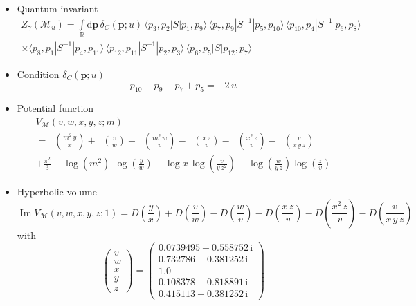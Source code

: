 \documentclass[12pt,reqno]{amsart}
\numberwithin{equation}{section}
\renewcommand{\Im}{\operatorname{Im}}
\DeclareMathOperator{\Li}{Li_2}
\newcommand{\I}{\mathrm{i}}
\begin{document}
\begin{itemize}
\item Quantum invariant
  \begin{multline}
    Z_\gamma \left( \mathcal{M}_u \right)
    =    \int\limits_\mathbb{R} 
    \mathrm{d} \boldsymbol{p} \,
    \delta_C(\boldsymbol{p}; u) \,
    \langle p_3 , p_2 | S | p_1 , p_9 \rangle \,
    \langle p_7 , p_9 | S^{-1} | p_5 , p_{10} \rangle \,
    \langle p_{10} , p_4 | S^{-1} | p_6 , p_8 \rangle 
    \\
    \times
    \langle p_8 , p_1 | S^{-1} | p_4 , p_{11} \rangle \,
    \langle p_{12} , p_{11} | S^{-1} | p_2 , p_3 \rangle \,
    \langle p_6 , p_5 | S | p_{12} , p_7 \rangle 
  \end{multline}

\item
Condition $\delta_C(\boldsymbol{p};u)$
  \begin{equation*}
    p_{10} - p_9 - p_7 + p_5
    = -  2 \, u
  \end{equation*}

\item Potential function
  \begin{multline*}
    V_{\mathcal{M}}(v, w, x,y,z; m)
    \\
    =
    \Li\left(\frac{m^2 \, y}{x}\right)
    + \Li\left(\frac{v}{w}\right)
    - \Li\left(\frac{m^2 \, w}{v}\right)
    -\Li\left(\frac{x \, z}{v}\right)
    - \Li\left(\frac{x^2 \, z}{v}\right)
    -\Li\left(\frac{v}{x \, y\, z}\right)
    \\
    +\frac{\pi^2}{3}
    + \log \left( m^2 \right) \, \log\left(\frac{y}{w}\right)
    + \log x \, \log\left(\frac{v}{y \, z^2}\right)
    + \log \left(\frac{w}{y \, z} \right)
    \log \left(\frac{z}{v}\right)
  \end{multline*}

\item Hyperbolic volume
  \begin{equation*}
    \Im V_{\mathcal{M}}(v, w, x,y,z; 1)
    =
    D\left(\frac{ y}{x}\right)
    + D\left(\frac{v}{w}\right)
    - D\left(\frac{ w}{v}\right)
    -D\left(\frac{x \, z}{v}\right)
    - D\left(\frac{x^2 \, z}{v}\right)
    -D\left(\frac{v}{x \, y\, z}\right)
  \end{equation*}
  with
  \begin{equation*}
    \begin{pmatrix}
      v \\ w\\ x\\ y \\ z
    \end{pmatrix}
    =
    \begin{pmatrix}
      0.0739495 + 0.558752 \, \I
      \\
      0.732786 + 0.381252 \, \I
      \\
      1.0
      \\
      0.108378 + 0.818891 \, \I
      \\
      0.415113 + 0.381252 \, \I
    \end{pmatrix}
  \end{equation*}



\end{itemize}
\end{document}
